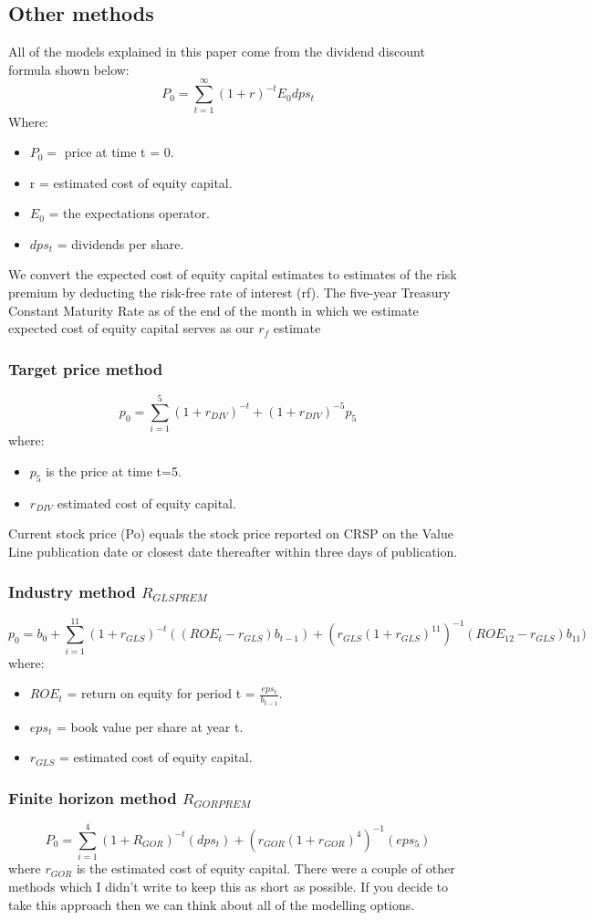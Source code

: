 \documentclass[12 pt]{article}
\begin{document}
\subsection{Other methods}
All of the models explained in this paper come from the dividend discount formula shown below:
\[
P_0 = \sum_{t=1}^{\infty}(1+r)^{-t}E_0dps_t
\]
Where: 
\begin{itemize}
\item $P_0 = $ price at time t = 0.
\item r = estimated cost of equity capital.
\item $E_0$ = the expectations operator.
\item $dps_t$ = dividends per share.
\end{itemize}
We convert the expected cost of equity capital estimates to estimates of the risk premium by deducting the risk-free rate of interest (rf). The five-year Treasury Constant Maturity Rate as of the end of the month in which we estimate expected cost of equity capital
serves as our $r_f$ estimate
\subsubsection{Target price method}
\[
p_0 = \sum_{i=1}^5(1+r_{DIV})^{-t}+(1+r_{DIV})^{-5}p_5
\]
where:
\begin{itemize}
\item $p_5$ is the price at time t=5. 
\item $r_{DIV}$ estimated cost of equity capital. 
\end{itemize}
Current stock price (Po) equals the stock price reported on CRSP on the Value Line publication date or closest date thereafter within three days of publication.
\subsubsection{Industry method $R_{GLSPREM}$}
\[
p_0 = b_0 +\sum_{i=1}^{11}(1+r_{GLS})^{-t}((ROE_t-r_{GLS})b_{t-1}) + (r_{GLS}(1+r_{GLS})^{11})^{-1}(ROE_{12}-r_{GLS})b_{11})
\]
where:
\begin{itemize}
\item $ROE_t$ = return on equity for period  t = $\frac{eps_t}{b_{t-1}}$.
\item $eps_t$ = book value per share at year t.
\item $r_{GLS}$ = estimated cost of equity capital. 
\end{itemize}
\subsubsection{Finite horizon method $R_{GORPREM}$}
\[
P_0 = \sum_{i=1}^4 (1+R_{GOR})^{-t}(dps_t)+(r_{GOR}(1+r_{GOR})^4)^{-1}(eps_5)
\]
where $r_{GOR}$ is the estimated cost of equity capital.
There were a couple of other methods which I didn't write to keep this as short as possible. If you decide to take this approach then we can think about all of the modelling options. 
\end{document}
